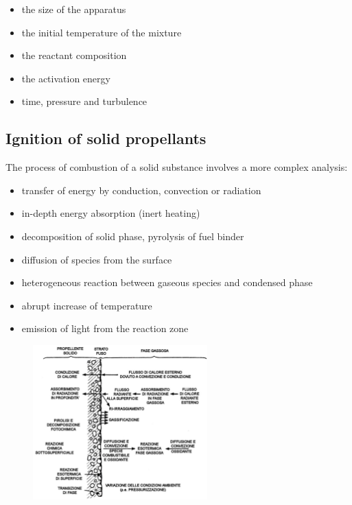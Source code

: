 \documentclass[12pt]{article}
\begin{document}
\begin{itemize}
    \item the size of the apparatus
    \item the initial temperature of the mixture
    \item the reactant composition
    \item the activation energy
    \item time, pressure and turbulence
\end{itemize}

\subsection{Ignition of solid propellants}

The process of combustion of a solid substance involves a more complex analysis:

\begin{itemize}
    \item transfer of energy by conduction, convection or radiation
    \item in-depth energy absorption (inert heating)
    \item decomposition of solid phase, pyrolysis of fuel binder
    \item diffusion of species from the surface
    \item heterogeneous reaction between gaseous species and condensed phase
    \item abrupt increase of temperature
    \item emission of light from the reaction zone
\end{itemize}

\begin{figure}[h!]
\centering
\includegraphics[width=0.6\textwidth]{figures/solid.png}
\end{figure}
\end{document}
